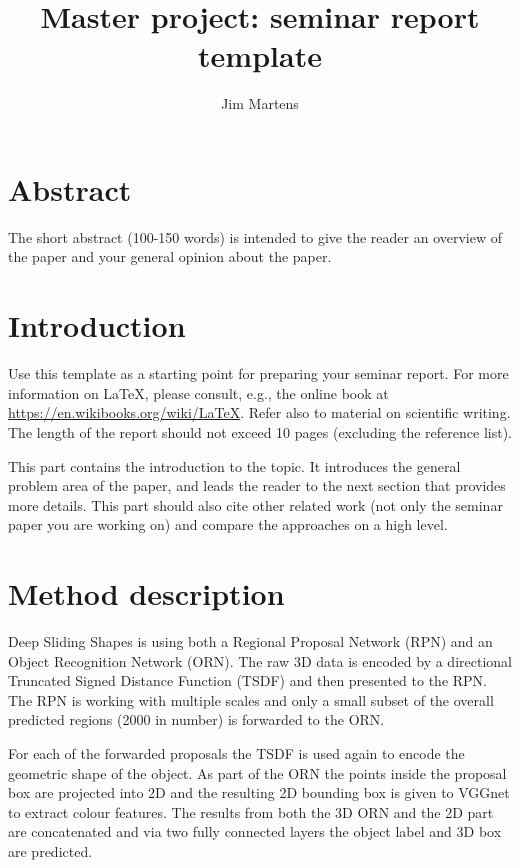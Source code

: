 \documentclass[12pt]{scrartcl}
\begin{document}
\title{Master project: seminar report template}
\author{Jim Martens}

\maketitle
\section*{Abstract}

The short abstract (100-150 words) is intended to give the reader an overview of the paper and your general opinion about the paper.


\setcounter{tocdepth}{2} 					%
\tableofcontents
{}
\clearpage

\section{Introduction}
Use this template as a starting point for preparing your seminar report.
For more information on \LaTeX, please consult, e.g., the online book at \url{https://en.wikibooks.org/wiki/LaTeX}.
Refer also to material on scientific writing.
The length of the report should not exceed 10 pages (excluding the reference list).

This part contains the introduction to the topic.
It introduces the general problem area of the paper, and leads the reader to the next section that provides more details.
This part should also cite other related work (not only the seminar paper you are working on) and compare the approaches on a high level.

\section{Method description}

Deep Sliding Shapes\cite{Song2016} is using both a Regional Proposal Network (RPN) and an
Object Recognition Network (ORN). The raw 3D data is encoded by a directional
Truncated Signed Distance Function (TSDF) and then presented to the RPN.
The RPN is working with multiple scales and only a small subset of the overall
predicted regions (2000 in number) is forwarded to the ORN.

For each of the forwarded proposals the TSDF is used again to encode the geometric
shape of the object. As part of the ORN the points inside the proposal box
are projected into 2D and the resulting 2D bounding box is given to VGGnet\cite{Simonyan2015}
to extract colour features. The results from both the 3D ORN and the 2D part
are concatenated and via two fully connected layers the object label and 3D box
are predicted.
\end{document}
